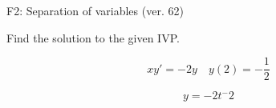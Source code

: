 \begin{exercise}
  \begin{exerciseTitle}F2: Separation of variables (ver. 62)\end{exerciseTitle}
  \begin{exerciseStatement}
    
Find the solution to the given IVP.

    
\[xy'= -2 y \hspace{1em} y( 2 ) = -\frac{1}{2}\]

  \end{exerciseStatement}
  \begin{exerciseAnswer}
    
\[y= -2 t^ -2\]

  \end{exerciseAnswer}
\end{exercise}